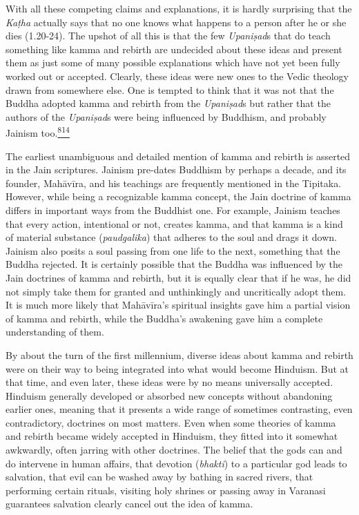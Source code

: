 With all these competing claims and explanations, it is hardly
surprising that the \emph{Kaṭha} actually says that no one knows what
happens to a person after he or she dies (1.20-24). The upshot of all
this is that the few \emph{Upaniṣad}s that do teach something like kamma
and rebirth are undecided about these ideas and present them as just
some of many possible explanations which have not yet been fully worked
out or accepted. Clearly, these ideas were new ones to the Vedic
theology drawn from somewhere else. One is tempted to think that it was
not that the Buddha adopted kamma and rebirth from the \emph{Upaniṣad}s
but rather that the authors of the \emph{Upaniṣad}s were being
influenced by Buddhism, and probably Jainism
too.\label{footprints_split_020.html_fnref814}\hyperref[footprints_split_025.htmlux5cux23fn814]{\textsuperscript{814}}

The earliest unambiguous and detailed mention of kamma and rebirth is
asserted in the Jain scriptures. Jainism pre-dates Buddhism by perhaps a
decade, and its founder, Mahāvīra, and his teachings are frequently
mentioned in the Tipitaka. However, while being a recognizable kamma
concept, the Jain doctrine of kamma differs in important ways from the
Buddhist one. For example, Jainism teaches that every action,
intentional or not, creates kamma, and that kamma is a kind of material
substance (\emph{paudgalika}) that adheres to the soul and drags it
down. Jainism also posits a soul passing from one life to the next,
something that the Buddha rejected. It is certainly possible that the
Buddha was influenced by the Jain doctrines of kamma and rebirth, but it
is equally clear that if he was, he did not simply take them for granted
and unthinkingly and uncritically adopt them. It is much more likely
that Mahāvīra's spiritual insights gave him a partial vision of kamma
and rebirth, while the Buddha's awakening gave him a complete
understanding of them.

By about the turn of the first millennium, diverse ideas about kamma and
rebirth were on their way to being integrated into what would become
Hinduism. But at that time, and even later, these ideas were by no means
universally accepted. Hinduism generally developed or absorbed new
concepts without abandoning earlier ones, meaning that it presents a
wide range of sometimes contrasting, even contradictory, doctrines on
most matters. Even when some theories of kamma and rebirth became widely
accepted in Hinduism, they fitted into it somewhat awkwardly, often
jarring with other doctrines. The belief that the gods can and do
intervene in human affairs, that devotion (\emph{bhakti}) to a
particular god leads to salvation, that evil can be washed away by
bathing in sacred rivers, that performing certain rituals, visiting holy
shrines or passing away in Varanasi guarantees salvation clearly cancel
out the idea of kamma.

